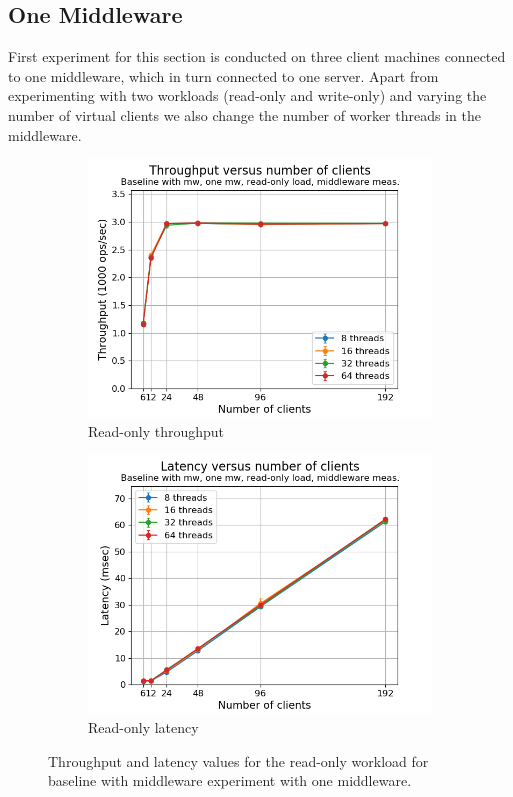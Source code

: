 \documentclass[11pt,a4paper]{article}
\begin{document}
\subsection{One Middleware} \label{sec:mwb1}
First experiment for this section is conducted on three client machines connected to one middleware, which in turn connected to one server. Apart from experimenting with two workloads (read-only and write-only) and varying the number of virtual clients we also change the number of worker threads in the middleware.
\begin{figure}[h!]
\centering
\begin{subfigure}{.5\textwidth}
  \centering
  \includegraphics[width=1.0\linewidth,trim={5px 0px 20px 0px},clip]{img/plot/mwb1-ro-tp_mw.png}
  \caption{Read-only throughput}
  \label{fig:mwb1-ro-tp_mw}
\end{subfigure}%
\begin{subfigure}{.5\textwidth}
  \centering
  \includegraphics[width=1.0\linewidth,trim={5px 0px 20px 0px},clip]{img/plot/mwb1-ro-lat_mw.png}
  \caption{Read-only latency}
  \label{fig:mwb1-ro-lat_mw}
\end{subfigure}
\caption{Throughput and latency values for the read-only workload for baseline with middleware experiment with one middleware.}
\label{fig:mwb1-ro_mw}
\end{figure}
\end{document}
